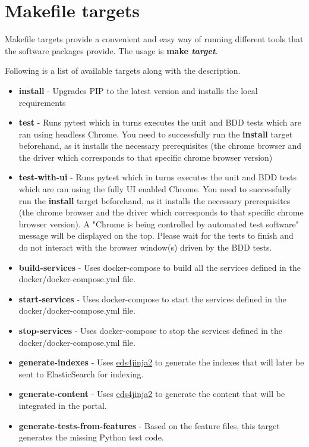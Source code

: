 \section{Makefile targets}
\label{sec:makefile_targets}
	Makefile targets provide a convenient and easy way of running different tools that the software packages provide. The usage is \textbf{make \textit{target}}.
	
	Following is a list of available targets along with the description.

\begin{itemize}
	\item \textbf{install}
	- Upgrades PIP to the latest version and installs the local requirements
	
	\item \textbf{test}
	- Runs pytest which in turns executes the unit and BDD tests which are ran using headless Chrome. You need to successfully run the \textbf{install} target beforehand, as it installs the necessary prerequisites (the chrome browser and the driver which corresponds to that specific chrome browser version)
	
	\item \textbf{test-with-ui}
	- Runs pytest which in turns executes the unit and BDD tests which are ran using the fully UI enabled Chrome. You need to successfully run the \textbf{install} target beforehand, as it installs the necessary prerequisites (the chrome browser and the driver which corresponds to that specific chrome browser version). A "Chrome is being controlled by automated test software" message will be displayed on the top. Please wait for the tests to finish and do not interact with the browser window(s) driven by the BDD tests. 
	
	\item \textbf{build-services}
	- Uses docker-compose to build all the services defined in the docker/docker-compose.yml file.
	
	\item \textbf{start-services}
	- Uses docker-compose to start the services defined in the docker/docker-compose.yml file.
	
	\item \textbf{stop-services}
	- Uses docker-compose to stop the services defined in the docker/docker-compose.yml file.
	
	\item \textbf{generate-indexes}
	- Uses \href{https://pypi.org/project/eds4jinja2/}{eds4jinja2} to generate the indexes that will later be sent to ElasticSearch for indexing.
	
	\item \textbf{generate-content}
	- Uses \href{https://pypi.org/project/eds4jinja2/}{eds4jinja2} to generate the content that will be integrated in the portal.
	
	\item \textbf{generate-tests-from-features}
	- Based on the feature files, this target generates the missing Python test code.
\end{itemize}